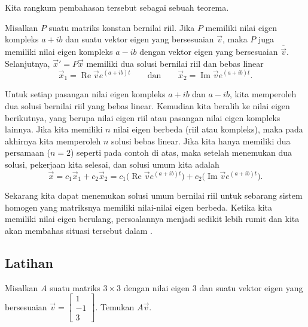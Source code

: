 \medskip

Kita rangkum pembahasan tersebut sebagai sebuah teorema.

\begin{theorem}
Misalkan $P$ suatu matriks konstan bernilai riil.
Jika $P$ memiliki nilai eigen kompleks $a+ib$ dan suatu vektor eigen yang bersesuaian
$\vec{v}$, maka $P$ juga memiliki nilai eigen kompleks $a-ib$ dengan
vektor eigen yang bersesuaian $\overline{\vec{v}}$.
Selanjutnya,
${\vec{x}}' = P\vec{x}$ memiliki
dua solusi bernilai riil dan bebas linear
\begin{equation*}
\vec{x}_1 = \operatorname{Re} \vec{v} e^{(a+ib)t}
\qquad
\text{dan}
\qquad
\vec{x}_2 = \operatorname{Im} \vec{v} e^{(a+ib)t} .
\end{equation*}
\end{theorem}

Untuk setiap pasangan nilai eigen kompleks $a+ib$ dan $a-ib$,
kita memperoleh dua solusi bernilai riil yang
bebas linear.
Kemudian kita beralih ke
nilai eigen berikutnya, yang berupa nilai eigen riil atau pasangan nilai eigen
kompleks lainnya.  Jika kita memiliki $n$ nilai eigen berbeda (riil atau kompleks), maka pada akhirnya kita memperoleh $n$ solusi bebas linear.
Jika kita hanya memiliki dua persamaan ($n=2$) seperti pada contoh di atas,
maka setelah menemukan dua solusi, pekerjaan kita
selesai, dan solusi umum kita adalah
\begin{equation*}
\vec{x} =
c_1 \vec{x}_1 + c_2 \vec{x}_2
= 
c_1 \bigl( \operatorname{Re} \vec{v} e^{(a+ib)t} \bigr) +
c_2 \bigl( \operatorname{Im} \vec{v} e^{(a+ib)t} \bigr)
.
\end{equation*}

Sekarang kita dapat menemukan solusi umum bernilai riil untuk sebarang sistem
homogen yang matriksnya memiliki nilai-nilai eigen berbeda.  Ketika kita memiliki nilai eigen
berulang, persoalannya menjadi sedikit lebih rumit dan kita akan membahas
situasi tersebut dalam .

\subsection{Latihan}

\begin{exercise}[mudah]
Misalkan $A$ suatu matriks $3 \times 3$ dengan nilai eigen 3 dan suatu
vektor eigen yang bersesuaian $\vec{v} =
\left[ \begin{smallmatrix} 1 \\ -1 \\ 3 \end{smallmatrix} \right]$.
Temukan $A \vec{v}$.
\end{exercise}

